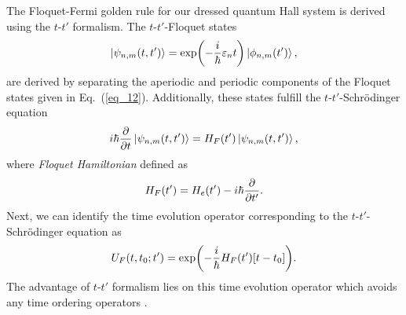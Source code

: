 The Floquet-Fermi golden rule for our dressed quantum Hall system is derived  using the $t$-$t'$ formalism. The $t$-$t'$-Floquet states \cite{grifoni98,wackerl20}
\begin{equation} \label{eq_c1}
  \ket{\psi_{n,m}(t,t')} =
  \exp(-\frac{i}{\hbar}\varepsilon_{n} t)\ket{\phi_{n,m}(t')},
\end{equation}
are derived by separating the aperiodic and periodic components of the Floquet states given in Eq.~(\ref{eq_12}). Additionally, these states fulfill the $t$-$t'$-Schrödinger equation \cite{grifoni98,wackerl20}
\begin{equation} \label{eq_c2}
  i \hbar \pdv{t}\ket{\psi_{n,m}(t,t')} =
  H_F(t') \ket{\psi_{n,m}(t,t')},
\end{equation}
where \textit{Floquet Hamiltonian} defined as
\begin{equation} \label{eq_c3}
  H_F(t') =
  H_e(t') - i\hbar \pdv{t'}.
\end{equation}
Next, we can identify the time evolution operator corresponding to the $t$-$t'$-Schrödinger equation as
\begin{equation} \label{eq_c4}
  U_F(t,t_0;t') = \exp(-\frac{i}{\hbar}H_F(t')\qty[t-t_0]).
\end{equation}
The advantage of $t$-$t'$ formalism lies on this time evolution operator which avoids any time ordering operators \cite{wackerl20}.


